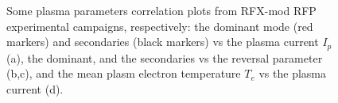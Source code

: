 \begin{figure}
    \centering
    \caption{Some plasma parameters correlation plots from RFX-mod RFP experimental campaigns, respectively: the dominant mode (red markers) and secondaries (black markers) vs the plasma current $I_p$ (a), the dominant, and the secondaries vs the reversal parameter (b,c), and the mean plasm electron temperature $T_e$ vs the plasma current (d). }
    \label{fig:rfx_parameters}
\end{figure}

